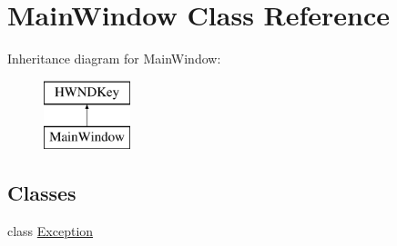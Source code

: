 \hypertarget{class_main_window}{}\section{Main\+Window Class Reference}
\label{class_main_window}
Inheritance diagram for Main\+Window\+:\begin{figure}[H]
\begin{center}
\leavevmode
\includegraphics[height=2.000000cm]{class_main_window}
\end{center}
\end{figure}
\subsection*{Classes}
\begin{DoxyCompactItemize}
\item 
class \hyperlink{class_main_window_1_1_exception}{Exception}
\end{DoxyCompactItemize}
